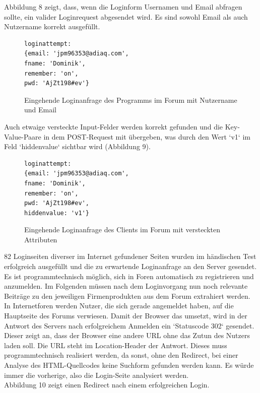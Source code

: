 Abbildung 8 zeigt, dass, wenn die Loginform Usernamen und Email abfragen sollte, ein valider Loginrequest abgesendet wird. Es sind sowohl Email als auch Nutzername korrekt ausgefüllt.

\begin{figure}[h!]
\begin{lstlisting}[language=HTML5]
loginattempt:
{email: 'jpm96353@adiaq.com',
fname: 'Dominik',
remember: 'on',
pwd: 'AjZt198#ev'}
\end{lstlisting}
\caption{Eingehende Loginanfrage des Programms im Forum mit Nutzername und Email}
\end{figure}

Auch etwaige versteckte Input-Felder werden korrekt gefunden und die Key-Value-Paare in dem POST-Request mit übergeben, was durch den Wert `v1` im Feld `hiddenvalue` sichtbar wird (Abbildung 9).

\begin{figure}[h!]
\begin{lstlisting}[language=HTML5]
loginattempt:
{email: 'jpm96353@adiaq.com',
fname: 'Dominik',
remember: 'on',
pwd: 'AjZt198#ev',
hiddenvalue: 'v1'}
\end{lstlisting}
\caption{Eingehende Loginanfrage des Clients im Forum mit versteckten Attributen}
\end{figure}


82 Loginseiten diverser im Internet gefundener Seiten wurden im händischen Test erfolgreich ausgefüllt und die zu erwartende Loginanfrage an den Server gesendet.\\
Es ist programmtechnisch möglich, sich in Foren automatisch zu registrieren und anzumelden. Im Folgenden müssen nach dem Loginvorgang nun noch relevante Beiträge zu den jeweiligen Firmenprodukten aus dem Forum extrahiert werden.\newline
In Internetforen werden Nutzer, die sich gerade angemeldet haben, auf die Hauptseite des Forums verwiesen. Damit der Browser das umsetzt, wird in der Antwort des Servers nach erfolgreichem Anmelden ein `Statuscode 302` gesendet. Dieser zeigt an, dass der Browser eine andere URL ohne das Zutun des Nutzers laden soll. Die URL steht im Location-Header der Antwort. Dieses muss programmtechnisch realisiert werden, da sonst, ohne den Redirect, bei einer Analyse des HTML-Quellcodes keine Suchform gefunden werden kann. Es würde immer die vorherige, also die Login-Seite analysiert werden.\\
Abbildung 10 zeigt einen Redirect nach einem erfolgreichen Login.

